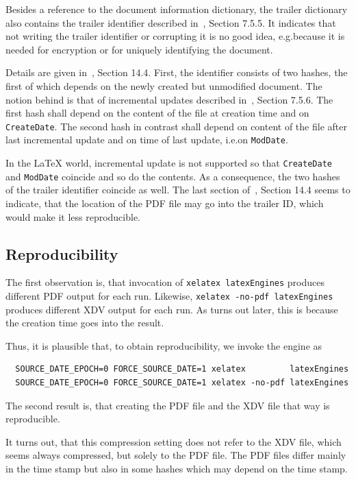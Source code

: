 \documentclass[a4paper]{article}%
\begin{document}
Besides a reference to the document information dictionary, 
the trailer dictionary also contains the trailer identifier 
described in~\cite{Pdf20}, Section 7.5.5. 
It indicates that not writing the trailer identifier or corrupting it is no good idea, 
e.g.\@ because it is needed for encryption or for uniquely identifying the document. 

Details are given in~\cite{Pdf20}, Section 14.4. 
First, the identifier consists of two hashes, 
the first of which depends on the newly created but unmodified document. 
The notion behind is that of incremental updates described in~\cite{Pdf20}, Section 7.5.6. 
The first hash shall depend on the content of the file 
at creation time and on \texttt{CreateDate}. 
The second hash in contrast shall depend on content of the file after last incremental update 
and on time of last update, i.e.\@ on \texttt{ModDate}. 

In the \LaTeX{} world, incremental update is not supported 
so that \texttt{CreateDate} and \texttt{ModDate} coincide 
and so do the contents. 
As a consequence, the two hashes of the trailer identifier coincide as well. 
The last section of~\cite{Pdf20}, Section 14.4 seems to indicate, 
that the location of the PDF file may go into the trailer ID, 
which would make it less reproducible. 


\subsection{Reproducibility}\label{subsec:reprod}

The first observation is, that invocation of \texttt{xelatex latexEngines} 
produces different PDF output for each run. 
Likewise, \texttt{xelatex -no-pdf latexEngines} produces different XDV output for each run. 
As turns out later, this is because the creation time goes into the result. 

Thus, it is plausible that, to obtain reproducibility, we invoke the engine as 
%
\begin{verbatim}
  SOURCE_DATE_EPOCH=0 FORCE_SOURCE_DATE=1 xelatex         latexEngines
  SOURCE_DATE_EPOCH=0 FORCE_SOURCE_DATE=1 xelatex -no-pdf latexEngines
\end{verbatim}

The second result is, that creating the PDF file and the XDV file that way is reproducible. 




It turns out, that this compression setting does not refer to the XDV file, 
which seems always compressed, but solely to the PDF file. 
The PDF files differ mainly in the time stamp 
but also in some hashes which may depend on the time stamp. 
\end{document}
